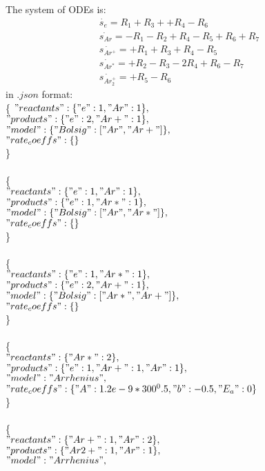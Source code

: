 \documentclass[11pt]{amsart}
\begin{document}
The system of ODEs is:
\begin{align*}
    \dot{s_e}= R_1 +R_3+ +R_4 -R_6\\
    \dot{s_{Ar}}= -R_1-R_2 +R_4- R_5+R_6+R_7\\
    \dot{s_{Ar^+}}=+R_1+R_3+R_4-R_5\\
    \dot{s_{Ar^*}}=+R_2-R_3-2R_4+R_6-R_7\\
    \dot{s_{Ar_2^+}}=+R_5-R_6
\end{align*}
in $.json$ format:\\
\{
$"reactants" : \{ "e" : 1, "Ar" : 1\},$\\
$"products" : \{ "e" : 2, "Ar+" : 1\},$\\
$"model" : \{"Bolsig": ["Ar", "Ar+"]\},$\\
$"rate_coeffs" : \{\}$\\
\}\\
\\
\{\\
	$"reactants" : \{ "e" : 1, "Ar" : 1\},$\\
	$"products" : \{ "e" : 1, "Ar*" : 1\},$\\
	$"model" : \{"Bolsig": ["Ar", "Ar*"]\},$\\
	$"rate_coeffs" : \{\}$\\
\}\\
\\
\{\\
	$"reactants" : \{ "e" : 1, "Ar*" : 1\},$\\
	$"products" : \{ "e" : 2, "Ar+" : 1\},$\\
	$"model" : \{"Bolsig": ["Ar*", "Ar+"]\},$\\
	$"rate_coeffs" : \{\}$\\
\}\\
\\
\{\\
	$"reactants" : \{ "Ar*" : 2\},$\\
	$"products" : \{ "e" : 1, "Ar+" : 1, "Ar" : 1\},$\\
	$"model" : "Arrhenius",$\\
$	"rate_coeffs" : \{"A" : 1.2e-9*300^0.5,"b": -0.5,"E_a": 0\}$\\
\}\\
\\
\{\\
	$"reactants" : \{ "Ar+" : 1, "Ar" : 2\},$\\
	$"products" : \{ "Ar2+" : 1, "Ar" : 1\},$\\
	$"model" : "Arrhenius",$\\
\end{document}
